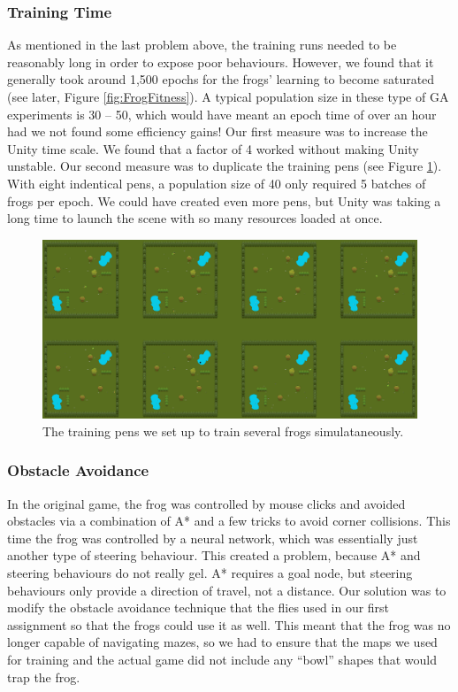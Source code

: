\subsubsection{Training Time}
As mentioned in the last problem above, the training runs needed to be reasonably long in order to expose poor behaviours. However, we found that it generally took around 1,500 epochs for the frogs' learning to become saturated (see later, Figure \ref{fig:FrogFitness}). A typical population size in these type of GA experiments is 30 -- 50, which would have meant an epoch time of over an hour had we not found some efficiency gains! Our first measure was to increase the Unity time scale. We found that a factor of 4 worked without making Unity unstable. Our second measure was to duplicate the training pens (see Figure \ref{fig:TrainingPens}). With eight indentical pens, a population size of 40 only required 5 batches of frogs per epoch. We could have created even more pens, but Unity was taking a long time to launch the scene with so many resources loaded at once.

\begin{figure}[!htbp]
    \centering
    \includegraphics[scale=0.3]{Figs/TrainingPens.png}
    \caption{The training pens we set up to train several frogs simulataneously.}
    \label{fig:TrainingPens}
\end{figure}

\subsubsection{Obstacle Avoidance}
In the original game, the frog was controlled by mouse clicks and avoided obstacles via a combination of A* and a few tricks to avoid corner collisions. This time the frog was controlled by a neural network, which was essentially just another type of steering behaviour. This created a problem, because A* and steering behaviours do not really gel. A* requires a goal node, but steering behaviours only provide a direction of travel, not a distance. Our solution was to modify the obstacle avoidance technique that the flies used in our first assignment so that the frogs could use it as well. This meant that the frog was no longer capable of navigating mazes, so we had to ensure that the maps we used for training and the actual game did not include any ``bowl'' shapes that would trap the frog.

